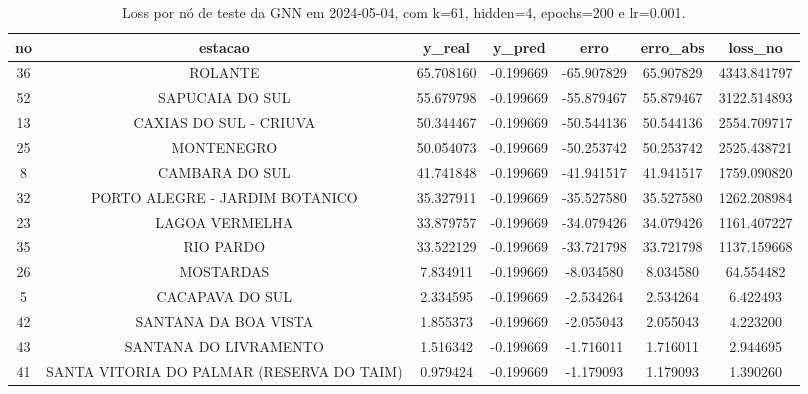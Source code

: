 \begin{table}[h]
\centering
\caption{Loss por nó de teste da GNN em 2024-05-04, com k=61, hidden=4, epochs=200 e lr=0.001.}
\label{tab:gnn_loss_nodes_k61_hidden4}
\begin{tabular}{ccccccc}
\toprule
no & estacao & y\_real & y\_pred & erro & erro\_abs & loss\_no \\
\midrule
36 & ROLANTE & 65.708160 & -0.199669 & -65.907829 & 65.907829 & 4343.841797 \\
52 & SAPUCAIA DO SUL & 55.679798 & -0.199669 & -55.879467 & 55.879467 & 3122.514893 \\
13 & CAXIAS DO SUL - CRIUVA & 50.344467 & -0.199669 & -50.544136 & 50.544136 & 2554.709717 \\
25 & MONTENEGRO & 50.054073 & -0.199669 & -50.253742 & 50.253742 & 2525.438721 \\
8 & CAMBARA DO SUL & 41.741848 & -0.199669 & -41.941517 & 41.941517 & 1759.090820 \\
32 & PORTO ALEGRE - JARDIM BOTANICO & 35.327911 & -0.199669 & -35.527580 & 35.527580 & 1262.208984 \\
23 & LAGOA VERMELHA & 33.879757 & -0.199669 & -34.079426 & 34.079426 & 1161.407227 \\
35 & RIO PARDO & 33.522129 & -0.199669 & -33.721798 & 33.721798 & 1137.159668 \\
26 & MOSTARDAS & 7.834911 & -0.199669 & -8.034580 & 8.034580 & 64.554482 \\
5 & CACAPAVA DO SUL & 2.334595 & -0.199669 & -2.534264 & 2.534264 & 6.422493 \\
42 & SANTANA DA BOA VISTA & 1.855373 & -0.199669 & -2.055043 & 2.055043 & 4.223200 \\
43 & SANTANA DO LIVRAMENTO & 1.516342 & -0.199669 & -1.716011 & 1.716011 & 2.944695 \\
41 & SANTA VITORIA DO PALMAR (RESERVA DO TAIM) & 0.979424 & -0.199669 & -1.179093 & 1.179093 & 1.390260 \\
\bottomrule
\end{tabular}
\end{table}
